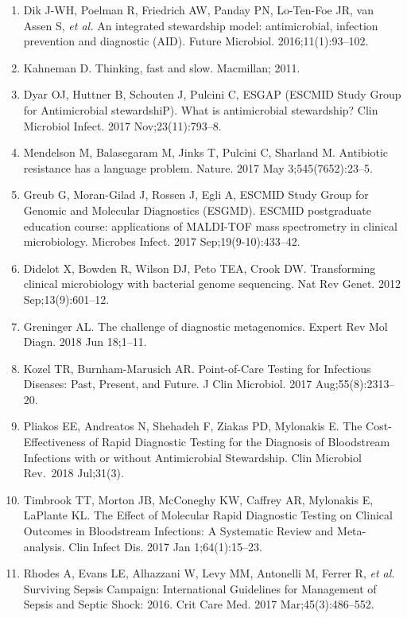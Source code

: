 \documentclass[
]{book}
\providecommand{\tightlist}{%
  \setlength{\itemsep}{0pt}\setlength{\parskip}{0pt}}
\begin{document}
\begin{enumerate}
\def\labelenumi{\arabic{enumi}.}
\tightlist
\item
  Dik J-WH, Poelman R, Friedrich AW, Panday PN, Lo-Ten-Foe JR, van Assen S, \emph{et al.} An integrated stewardship model: antimicrobial, infection prevention and diagnostic (AID). Future Microbiol. 2016;11(1):93--102.
\item
  Kahneman D. Thinking, fast and slow. Macmillan; 2011.
\item
  Dyar OJ, Huttner B, Schouten J, Pulcini C, ESGAP (ESCMID Study Group for Antimicrobial stewardshiP). What is antimicrobial stewardship? Clin Microbiol Infect. 2017 Nov;23(11):793--8.
\item
  Mendelson M, Balasegaram M, Jinks T, Pulcini C, Sharland M. Antibiotic resistance has a language problem. Nature. 2017 May 3;545(7652):23--5.
\item
  Greub G, Moran-Gilad J, Rossen J, Egli A, ESCMID Study Group for Genomic and Molecular Diagnostics (ESGMD). ESCMID postgraduate education course: applications of MALDI-TOF mass spectrometry in clinical microbiology. Microbes Infect. 2017 Sep;19(9-10):433--42.
\item
  Didelot X, Bowden R, Wilson DJ, Peto TEA, Crook DW. Transforming clinical microbiology with bacterial genome sequencing. Nat Rev Genet. 2012 Sep;13(9):601--12.
\item
  Greninger AL. The challenge of diagnostic metagenomics. Expert Rev Mol Diagn. 2018 Jun 18;1--11.
\item
  Kozel TR, Burnham-Marusich AR. Point-of-Care Testing for Infectious Diseases: Past, Present, and Future. J Clin Microbiol. 2017 Aug;55(8):2313--20.
\item
  Pliakos EE, Andreatos N, Shehadeh F, Ziakas PD, Mylonakis E. The Cost-Effectiveness of Rapid Diagnostic Testing for the Diagnosis of Bloodstream Infections with or without Antimicrobial Stewardship. Clin Microbiol Rev.~2018 Jul;31(3).
\item
  Timbrook TT, Morton JB, McConeghy KW, Caffrey AR, Mylonakis E, LaPlante KL. The Effect of Molecular Rapid Diagnostic Testing on Clinical Outcomes in Bloodstream Infections: A Systematic Review and Meta-analysis. Clin Infect Dis. 2017 Jan 1;64(1):15--23.
\item
  Rhodes A, Evans LE, Alhazzani W, Levy MM, Antonelli M, Ferrer R, \emph{et al.} Surviving Sepsis Campaign: International Guidelines for Management of Sepsis and Septic Shock: 2016. Crit Care Med. 2017 Mar;45(3):486--552.

\end{enumerate}
\end{document}
